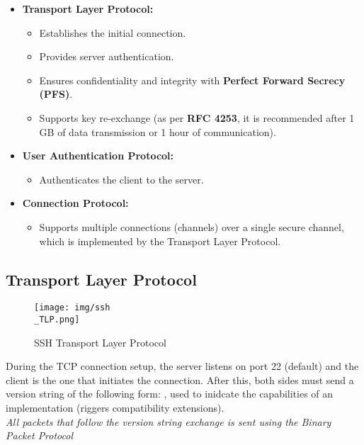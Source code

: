 \begin{itemize}
    \item \textbf{Transport Layer Protocol:} 
    \begin{itemize}[itemsep=0pt]
        \item Establishes the initial connection.
        \item Provides server authentication.
        \item Ensures confidentiality and integrity with \textbf{Perfect Forward Secrecy (PFS)}.
        \item Supports key re-exchange (as per \textbf{RFC 4253}, it is recommended after 1 GB of data transmission or 1 hour of communication).
    \end{itemize}
    
    \item \textbf{User Authentication Protocol:} 
    \begin{itemize}
        \item Authenticates the client to the server.
    \end{itemize}
    
    \item \textbf{Connection Protocol:} 
    \begin{itemize}
        \item Supports multiple connections (channels) over a single secure channel, which is implemented by the Transport Layer Protocol.
    \end{itemize}
\end{itemize}

\subsection{Transport Layer Protocol}

\begin{figure}[ht]
    \centering
    \texttt{[image: img/ssh\\\_TLP.png]}
    \caption{SSH Transport Layer Protocol}
    \label{fig:ssh-tlp}
\end{figure}

During the TCP connection setup, the server listens on port 22 (default) and the client is the one that initiates the connection. After this, both sides must send a version string of the following form: , used to inidcate the capabilities of an implementation (riggers compatibility extensions). \\
\textit{All packets that follow the version string exchange is sent 
using the Binary Packet Protocol }


